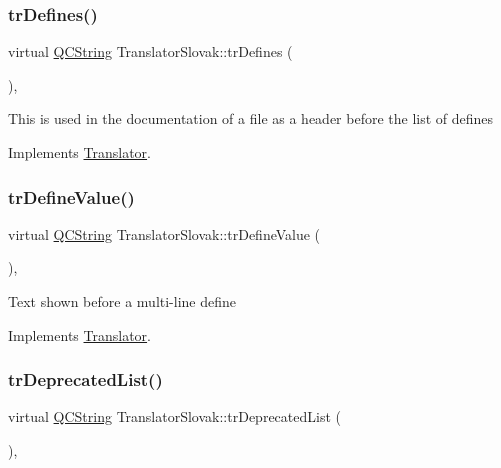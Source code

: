 \subsubsection{\texorpdfstring{trDefines()}{trDefines()}}
{\footnotesize\ttfamily virtual \mbox{\hyperlink{class_q_c_string}{Q\+C\+String}} Translator\+Slovak\+::tr\+Defines (\begin{DoxyParamCaption}{ }\end{DoxyParamCaption})\hspace{0.3cm}{\ttfamily [inline]}, {\ttfamily [virtual]}}

This is used in the documentation of a file as a header before the list of defines 

Implements \mbox{\hyperlink{class_translator}{Translator}}.

\mbox{\label{class_translator_slovak_a1e093ab34699c7d5de6c479f516e6d6c}} 
\subsubsection{\texorpdfstring{trDefineValue()}{trDefineValue()}}
{\footnotesize\ttfamily virtual \mbox{\hyperlink{class_q_c_string}{Q\+C\+String}} Translator\+Slovak\+::tr\+Define\+Value (\begin{DoxyParamCaption}{ }\end{DoxyParamCaption})\hspace{0.3cm}{\ttfamily [inline]}, {\ttfamily [virtual]}}

Text shown before a multi-\/line define 

Implements \mbox{\hyperlink{class_translator}{Translator}}.

\mbox{\label{class_translator_slovak_a8cd761f5762a965cdbd6175e0e965611}} 
\subsubsection{\texorpdfstring{trDeprecatedList()}{trDeprecatedList()}}
{\footnotesize\ttfamily virtual \mbox{\hyperlink{class_q_c_string}{Q\+C\+String}} Translator\+Slovak\+::tr\+Deprecated\+List (\begin{DoxyParamCaption}{ }\end{DoxyParamCaption})\hspace{0.3cm}{\ttfamily [inline]}, {\ttfamily [virtual]}}

